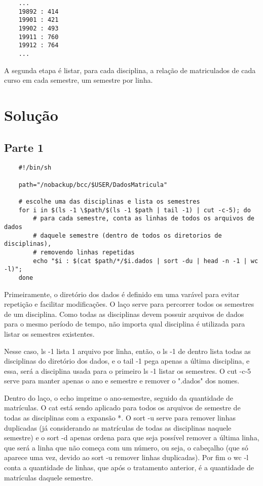 \documentclass[oneside, 11 pt]{article}
\begin{document}
	
	\begin{lstlisting}
	...
	19892 : 414
	19901 : 421
	19902 : 493
	19911 : 760
	19912 : 764
	...
	\end{lstlisting}
	
	A segunda etapa é listar, para cada disciplina, a relação de matriculados de cada curso em cada semestre, um semestre por linha.
	
	\section{Solução}
	
	\subsection{Parte 1}
	\begin{lstlisting}
	#!/bin/sh
	
	path="/nobackup/bcc/$USER/DadosMatricula"
	
	# escolhe uma das disciplinas e lista os semestres
	for i in $(ls -1 \$path/$(ls -1 $path | tail -1) | cut -c-5); do
		# para cada semestre, conta as linhas de todos os arquivos de dados
		# daquele semestre (dentro de todos os diretorios de disciplinas),
		# removendo linhas repetidas
		echo "$i : $(cat $path/*/$i.dados | sort -du | head -n -1 | wc -l)";
	done
	\end{lstlisting}
	Primeiramente, o diretório dos dados é definido em uma varável para evitar repetição e facilitar modificações.
	O laço serve para percorrer todos os semestres de um disciplina. Como todas as disciplinas devem possuir arquivos de dados para o mesmo período de tempo, não importa qual disciplina é utilizada para listar os semestres existentes.
	
	Nesse caso, ls -1 lista 1 arquivo por linha, então, o ls -1 de dentro lista todas as disciplinas do diretório dos dados, e o tail -1 pega apenas a última disciplina, e essa, será a disciplina usada para o primeiro ls -1 listar os semestres. O cut -c-5 serve para manter apenas o ano e semestre e remover o ".dados" dos nomes.
	
	Dentro do laço, o echo imprime o ano-semestre, seguido da quantidade de matrículas. O cat está sendo aplicado para todos os arquivos de semestre de todas as disciplinas com a expansão *. O sort -u serve para remover linhas duplicadas (já considerando as matrículas de todas as disciplinas naquele semestre) e o sort -d apenas ordena para que seja possível remover a última linha, que será a linha que não começa com um número, ou seja, o cabeçalho (que só aparece uma vez, devido ao sort -u remover linhas duplicadas). Por fim o wc -l conta a quantidade de linhas, que após o tratamento anterior, é a quantidade de matrículas daquele semestre.
	
\end{document}
